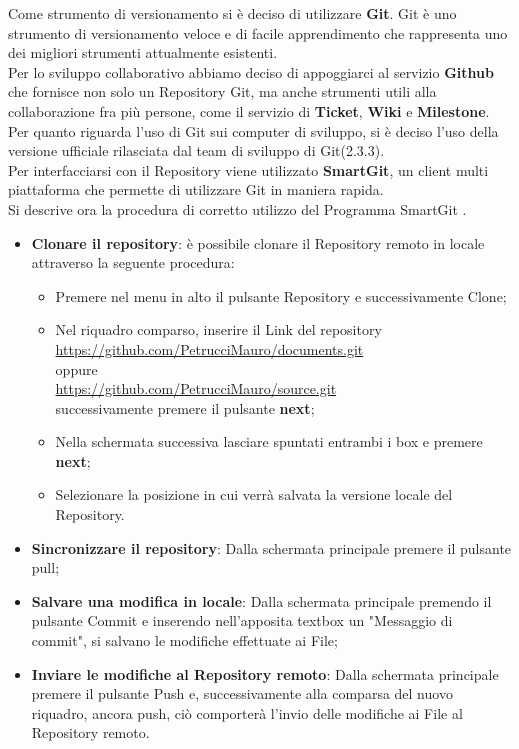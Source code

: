 Come strumento di versionamento si è deciso di utilizzare \textbf{Git}.
Git è uno strumento di versionamento veloce e di facile apprendimento che
rappresenta uno dei migliori strumenti attualmente esistenti.\\ Per lo sviluppo collaborativo abbiamo deciso di appoggiarci al servizio \textbf{Github} che fornisce non solo un Repository Git, ma anche strumenti utili alla collaborazione fra più persone, come il servizio di \textbf{Ticket}, \textbf{Wiki} e \textbf{Milestone}.\\
Per quanto riguarda l’uso di Git sui computer di sviluppo, si è deciso l’uso
della versione ufficiale rilasciata dal team di sviluppo di Git(2.3.3).\\
Per interfacciarsi con il Repository viene utilizzato \textbf{SmartGit}, un client multi piattaforma che permette di utilizzare Git in maniera rapida.\\
Si descrive ora la procedura di corretto utilizzo del Programma SmartGit .
\begin{itemize}

\item 	\textbf{Clonare il repository}: è possibile clonare il Repository remoto in locale attraverso la seguente procedura:

\begin{itemize}
\item Premere nel menu in alto il pulsante Repository e successivamente Clone;
\item Nel riquadro comparso, inserire il Link del repository\\ \url{https://github.com/PetrucciMauro/documents.git}\\
oppure\\
\url{https://github.com/PetrucciMauro/source.git}\\
successivamente premere il pulsante \textbf{next};
\item Nella schermata successiva lasciare spuntati entrambi i box e premere \textbf{next};
\item Selezionare la posizione in cui verrà salvata la versione locale del Repository.
\end{itemize}
\item \textbf{Sincronizzare il repository}: Dalla schermata principale premere il pulsante pull; 
\item \textbf{Salvare una modifica in locale}: Dalla schermata principale premendo il pulsante Commit e inserendo nell'apposita textbox un "Messaggio di commit", si salvano le modifiche effettuate ai File;
\item \textbf{Inviare le modifiche al Repository remoto}: Dalla schermata principale premere il pulsante Push e, successivamente alla comparsa del nuovo riquadro, ancora push, ciò comporterà l'invio delle modifiche ai File al Repository remoto.

\end{itemize}

